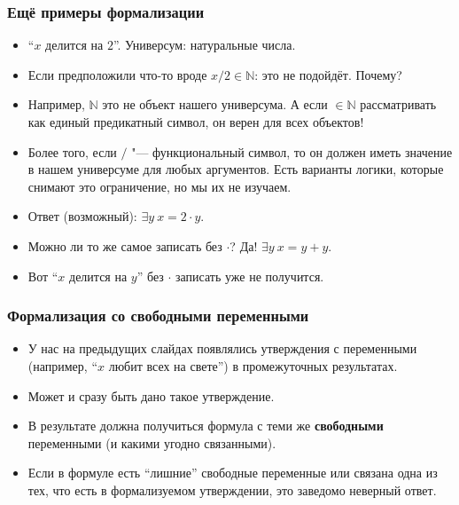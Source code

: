 \documentclass[10pt]{beamer}
\begin{document}
\begin{frame}
    \frametitle{Ещё примеры формализации}
    \begin{itemize}
        \item \enquote{$x$ делится на $2$}. Универсум: натуральные числа.
        \item Если предположили что-то вроде $x / 2 \in \mathbb{N}$: это не подойдёт. Почему? \pause
        \item Например, $\mathbb{N}$ это не объект нашего универсума. А если $\in \mathbb{N}$ рассматривать как единый предикатный символ, он верен для всех объектов! \pause 
        \item Более того, если $/$ "--- функциональный символ, то он должен иметь значение в нашем универсуме для любых аргументов. Есть варианты логики, которые снимают это ограничение, но мы их не изучаем. \pause
        \item Ответ (возможный): \pause $\exists y ~ x = 2 \cdot y$. \pause
        \item Можно ли то же самое записать без $\cdot$? \pause Да! $\exists y ~ x = y + y$. \pause
        \item Вот \enquote{$x$ делится на $y$} без $\cdot$ записать уже не получится. \pause
    \end{itemize}
 \end{frame}
 
\begin{frame}
   \frametitle{Формализация со свободными переменными}
   \begin{itemize}
       \item У нас на предыдущих слайдах появлялись утверждения с переменными (например, \enquote{$x$ любит всех на свете}) в промежуточных результатах. 
       \item Может и сразу быть дано такое утверждение. \pause
       \item В результате должна получиться формула с теми же \textbf<3->{свободными} переменными (и какими угодно связанными). \pause
       \item Если в формуле есть \enquote{лишние} свободные переменные или связана одна из тех, что есть в формализуемом утверждении, это заведомо неверный ответ.
   \end{itemize}
\end{frame}
\end{document}
